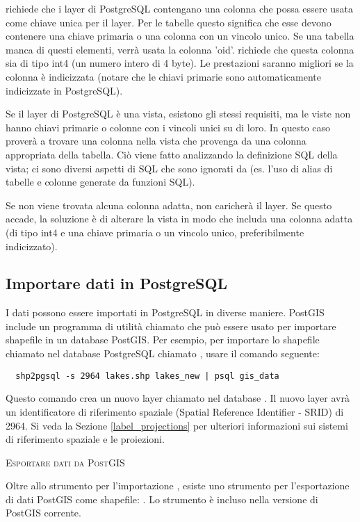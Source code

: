 \qg richiede che i layer di PostgreSQL contengano una colonna che possa essere usata come
chiave unica per il layer. Per le tabelle questo significa che esse devono
contenere una chiave primaria o una colonna con un vincolo unico. 
Se una tabella manca di questi elementi, verrà usata la colonna 'oid'. 
\qg richiede che questa colonna sia di tipo int4 (un numero intero di 4 byte). 
Le prestazioni saranno migliori se la colonna è indicizzata (notare che le 
chiavi primarie sono automaticamente indicizzate in PostgreSQL).

Se il layer di PostgreSQL è una vista, esistono gli stessi requisiti, ma le
viste non hanno chiavi primarie o colonne con i vincoli unici su di loro. In
questo caso \qg proverà a trovare una colonna nella vista che provenga 
da una colonna appropriata della tabella. Ciò viene fatto analizzando la 
definizione SQL della vista; ci sono diversi aspetti di SQL che sono ignorati da \qg 
(es. l'uso di alias di tabelle e colonne generate da funzioni SQL).

Se non viene trovata alcuna colonna adatta, \qg non caricherà il layer. 
Se questo accade, la soluzione è di alterare la vista in modo che includa una 
colonna adatta (di tipo int4 e una chiave primaria o un vincolo unico, 
preferibilmente indicizzato).

\subsection{Importare dati in PostgreSQL}\label{sec:loading_postgis_data}

I dati possono essere importati in PostgreSQL in diverse maniere. PostGIS
include un programma di utilità chiamato  che può essere
usato per importare shapefile in un database PostGIS. Per esempio, per
importare lo shapefile chiamato 
nel database PostgreSQL chiamato , usare il comando
seguente:

\begin{verbatim} 
  shp2pgsql -s 2964 lakes.shp lakes_new | psql gis_data
\end{verbatim}

Questo comando crea un nuovo layer chiamato  nel database
. Il nuovo layer avrà un identificatore di riferimento 
spaziale (Spatial Reference Identifier - SRID) di 2964. 
Si veda la Sezione \ref{label_projections} per ulteriori informazioni
sui sistemi di riferimento spaziale e le proiezioni.
\begin{Tip}
\caption{\textsc{Esportare dati da PostGIS}}
Oltre allo strumento per l'importazione , esiste uno 
strumento per l'esportazione di dati PostGIS come shapefile:
. Lo strumento è incluso nella versione di PostGIS corrente.
\end{Tip}

